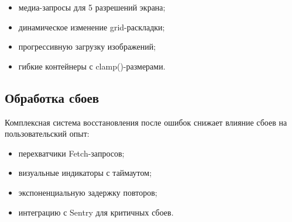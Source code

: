 \begin{itemize}  
	\item медиа-запросы для 5 разрешений экрана;  
	\item динамическое изменение grid-раскладки;  
	\item прогрессивную загрузку изображений;  
	\item гибкие контейнеры с clamp()-размерами.  
\end{itemize}  

\subsection{Обработка сбоев}  
Комплексная система восстановления после ошибок снижает влияние сбоев на пользовательский опыт:  

\begin{itemize}  
	\item перехватчики Fetch-запросов;  
	\item визуальные индикаторы с таймаутом;  
	\item экспоненциальную задержку повторов;  
	\item интеграцию с Sentry для критичных сбоев.  
\end{itemize}  
